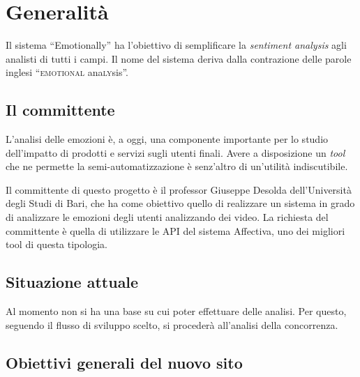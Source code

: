 
\chapter{Generalità}\label{chap:generalita}

Il sistema ``Emotionally'' ha l'obiettivo di semplificare la \textit{sentiment
analysis} agli analisti di tutti i campi. Il nome del sistema deriva dalla
contrazione delle parole inglesi ``\textsc{emotional} ana\textsc{ly}sis''.

\section{Il committente}\label{sec:il-committente}

L'analisi delle emozioni è, a oggi, una componente importante per lo studio
dell'impatto di prodotti e servizi sugli utenti finali. Avere a disposizione un
\textit{tool} che ne permette la semi-automatizzazione è senz'altro di
un'utilità indiscutibile.

Il committente di questo progetto è il professor Giuseppe Desolda
dell'Università degli Studi di Bari, che ha come obiettivo quello di realizzare
un sistema in grado di analizzare le emozioni degli utenti analizzando dei
video. La richiesta del committente è quella di utilizzare le API del sistema
Affectiva, uno dei migliori tool di questa tipologia.

\section{Situazione attuale}\label{sec:situazione-attuale}

Al momento non si ha una base su cui poter effettuare delle analisi. Per questo,
seguendo il flusso di sviluppo scelto, si procederà all'analisi della concorrenza. 

\section{Obiettivi generali del nuovo sito}\label{sec:obiettivi-generali-del-nuovo-sito}
